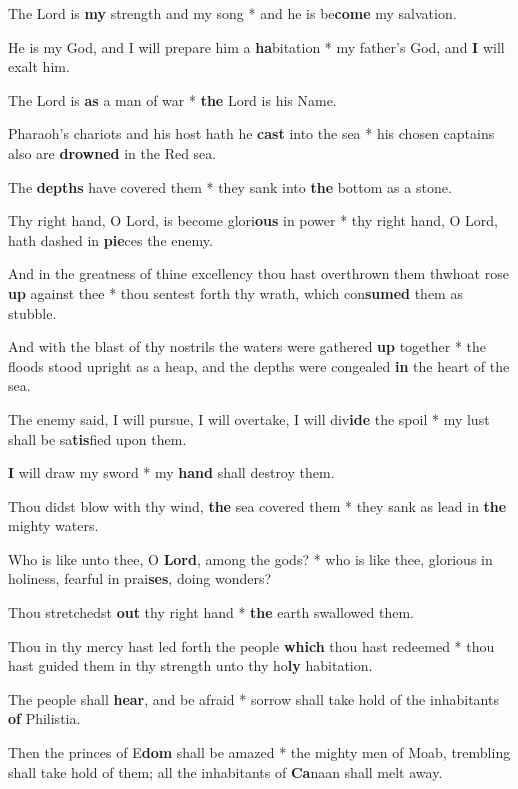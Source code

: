 \begin{multicols}{2}
	The Lord is \textbf{my} strength and my song * and he is be\textbf{come} my salvation.
	
	He is my God, and I will prepare him a \textbf{ha}bitation * my father's God, and \textbf{I} will exalt him.
	
	The Lord is \textbf{as} a man of war * \textbf{the} Lord is his Name.
	
	Pharaoh's chariots and his host hath he \textbf{cast} into the sea * his chosen captains also are \textbf{drowned} in the Red sea.
	
	The \textbf{depths} have covered them * they sank into \textbf{the} bottom as a stone.
	
	Thy right hand, O Lord, is become glori\textbf{ous} in power * thy right hand, O Lord, hath dashed in \textbf{pie}ces the enemy.
	
	And in the greatness of thine excellency thou hast overthrown them thwhoat rose \textbf{up} against thee * thou sentest forth thy wrath, which con\textbf{sumed} them as stubble.
	
	And with the blast of thy nostrils the waters were gathered \textbf{up} together * the floods stood upright as a heap, and the depths were congealed \textbf{in} the heart of the sea.
	
	The enemy said, I will pursue, I will overtake, I will div\textbf{ide} the spoil * my lust shall be sa\textbf{tis}fied upon them.
	
	\textbf{I} will draw my sword * my \textbf{hand} shall destroy them.
	
	Thou didst blow with thy wind, \textbf{the} sea covered them * they sank as lead in \textbf{the} mighty waters.
	
	Who is like unto thee, O \textbf{Lord}, among the gods? * who is like thee, glorious in holiness, fearful in prai\textbf{ses}, doing wonders?
	
	Thou stretchedst \textbf{out} thy right hand * \textbf{the} earth swallowed them.
	
	Thou in thy mercy hast led forth the people \textbf{which} thou hast redeemed * thou hast guided them in thy strength unto thy ho\textbf{ly} habitation.
	
	The people shall \textbf{hear}, and be afraid * sorrow shall take hold of the inhabitants \textbf{of} Philistia.
	
	Then the princes of E\textbf{dom} shall be amazed * the mighty men of Moab, trembling shall take hold of them; all the inhabitants of \textbf{Ca}naan shall melt away.
	

\end{multicols}
